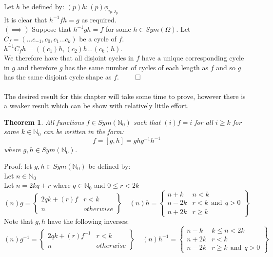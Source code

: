 \documentclass{report}
\newtheorem{theorem}{Theorem}[section]
\begin{document}
Let $h$ be defined by:
$(p)h:(p)\phi_{i_p,j_p}$\\
It is clear that $h^{-1} f h = g$ as required.\\
$(\implies)$ Suppose that $h^{-1}gh = f$ for some $h \in Sym(\Omega)$.
Let $C_f=(\ldots c_{-1},c_0, c_1 \ldots c_k)$ be a cycle of $f$.\\
$h^{-1}C_fh = ((c_1)h,(c_2)h \ldots (c_k)h)$.\\
We therefore have that all disjoint cycles in $f$ have a unique corresponding cycle in $g$ and therefore $g$ has the same number of cycles of each length as $f$ and so $g$ has the same disjoint cycle shape as $f$. $\qed$\\
\\
The desired result for this chapter will take some time to prove, however there is a weaker result which can be show with relatively little effort.
\begin{theorem}
All functions $f\in Sym(\mathbb{N}_0)$ such that $(i)f = i$ for all $i \geq k$ for some $k\in \mathbb{N}_0$ can be written in the form:
\[f=[g,h]=ghg^{-1}h^{-1}\]
where $g,h\in Sym(\mathbb{N}_0)$.
\end{theorem}\par
Proof: let $g,h\in Sym(\mathbb{N}_0)$ be defined by:\\
Let $n\in\mathbb{N}_0$\\
Let $n = 2kq + r$ where $q\in \mathbb{N}_0$ and $0\leq r < 2k$
\[(n)g=
 \left\{
    \begin{array}{lr}
      2qk + (r)f&  r<k\\
      n& otherwise
    \end{array}
    \right\}
\ \ \ \ \ (n)h=
 \left\{
    \begin{array}{lr}
      n + k&  n<k \\
      n-2k&  r<k\ \ \text{and}\ \ q>0\\
      n+2k& r\geq k
    \end{array}
    \right\}
\]
Note that $g,h$ have the following inverses:
\[(n)g^{-1}=
 \left\{
    \begin{array}{lr}
      2qk + (r)f^{-1}& r<k\\
      n& otherwise
    \end{array}
    \right\}
\ \ \ \ \ (n)h^{-1}=
 \left\{
    \begin{array}{lr}
      n - k&  k\leq n<2k \\
      n+2k&  r<k\\
      n-2k&  r\geq k\ \ \text{and}\ \ q>0
    \end{array}
    \right\}
\]
\end{document}
